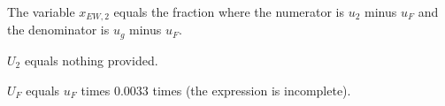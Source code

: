 The variable \( x_{EW,2} \) equals the fraction where the numerator is \( u_2 \) minus \( u_F \) and the denominator is \( u_g \) minus \( u_F \).

\( U_2 \) equals nothing provided.

\( U_F \) equals \( u_F \) times \( 0.0033 \) times (the expression is incomplete).